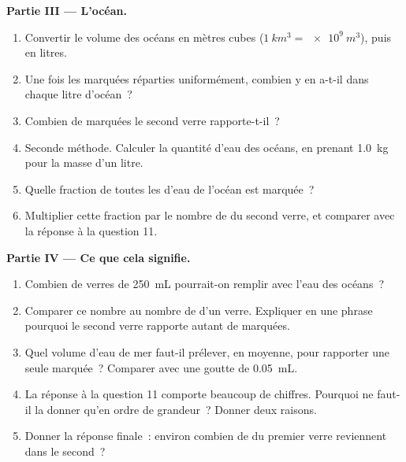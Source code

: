 \begin{problem}
\medskip
\noindent\textbf{Partie III --- L'océan.}
\begin{enumerate}[resume]
  \item Convertir le volume des océans en mètres cubes
        ($\qty{1}{km^3} = \qty{e9}{m^3}$), puis en litres.
  \item Une fois les  marquées réparties uniformément, combien
        y en a-t-il dans chaque litre d'océan~?
  \item Combien de  marquées le second verre rapporte-t-il~?
  \item Seconde méthode. Calculer la quantité d'eau des océans, en
        prenant \qty{1.0}{kg} pour la masse d'un litre.
  \item Quelle fraction de toutes les  d'eau de l'océan est
        marquée~?
  \item Multiplier cette fraction par le nombre de  du second
        verre, et comparer avec la réponse à la question 11.
\end{enumerate}

\medskip
\noindent\textbf{Partie IV --- Ce que cela signifie.}
\begin{enumerate}[resume]
  \item Combien de verres de \qty{250}{mL} pourrait-on remplir avec
        l'eau des océans~?
  \item Comparer ce nombre au nombre de  d'un verre. Expliquer
        en une phrase pourquoi le second verre rapporte autant de
         marquées.
  \item Quel volume d'eau de mer faut-il prélever, en moyenne, pour
        rapporter une seule  marquée~? Comparer avec une goutte
        de \qty{0.05}{mL}.
  \item La réponse à la question 11 comporte beaucoup de chiffres.
        Pourquoi ne faut-il la donner qu'en ordre de grandeur~? Donner
        deux raisons.
  \item Donner la réponse finale~: environ combien de  du
        premier verre reviennent dans le second~?
\end{enumerate}
\end{problem}
